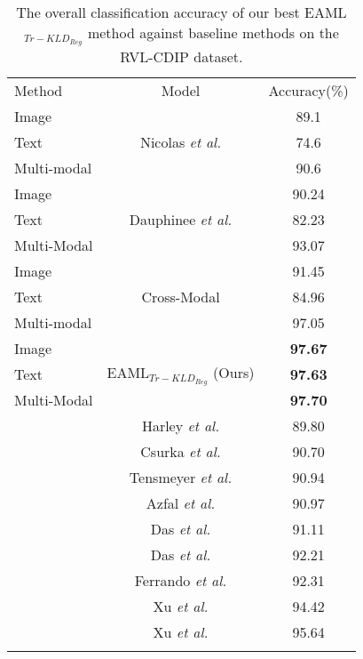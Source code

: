 \documentclass[twocolumn]{svjour3}
\newcommand{\etal}{\textit{et al.}}
\begin{document}
\begin{table}[tbh]
\small
\centering
\caption{The overall classification accuracy of our best EAML$_{{Tr-KLD}_{Reg}}$ method against baseline methods on the RVL-CDIP dataset.}
    \begin{tabular}{lcc}
    \hline\noalign{\smallskip}
     Method & Model & Accuracy(\%)\\
     \noalign{\smallskip}\hline\noalign{\smallskip}
    Image & \multirow{3}{*}{Nicolas \etal \cite{audebert2019multimodal}} & 89.1\\
    Text && 74.6\\
    Multi-modal && 90.6\\
    \noalign{\smallskip}\hline\noalign{\smallskip}
    Image & \multirow{3}{*}{Dauphinee \etal \cite{Dauphinee2019ModularMA}} & 90.24\\
    Text && 82.23\\
    Multi-Modal && 93.07\\
    \noalign{\smallskip}\hline\noalign{\smallskip}
    Image & \multirow{3}{*}{Cross-Modal \cite{souhailbakkali}} & 91.45\\
    Text && 84.96\\
    Multi-modal && 97.05\\
    \noalign{\smallskip}\hline\noalign{\smallskip}
    Image & \multirow{3}{*}{EAML$_{{Tr-KLD}_{Reg}}$ (Ours)} & \textbf{97.67}\\
    Text && \textbf{97.63}\\
    Multi-Modal && \textbf{97.70}\\
    \noalign{\smallskip}\hline\noalign{\smallskip}
    \multirow{8}{*}{Baselines} 
    & Harley \etal \cite{Harley2015EvaluationOD} & 89.80\\
    & Csurka \etal \cite{Csurka2016WhatIT} & 90.70\\
    & Tensmeyer \etal \cite{tensmeyer2017analysis} & 90.94\\
    & Azfal \etal \cite{Afzal2017CuttingTE} & 90.97\\
    & Das \etal \cite{8545630} & 91.11\\
    & Das \etal \cite{8545630} & 92.21\\
    & Ferrando \etal \cite{Ferrando2020ImprovingAA} & 92.31\\
    & Xu \etal \cite{Xu2020LayoutLMPO} & 94.42\\
    & Xu \etal \cite{Xu2020LayoutLMv2MP} & 95.64\\
    \noalign{\smallskip}\hline
    \end{tabular}
    \label{tab:Comparisontable}
\end{table}
\end{document}
